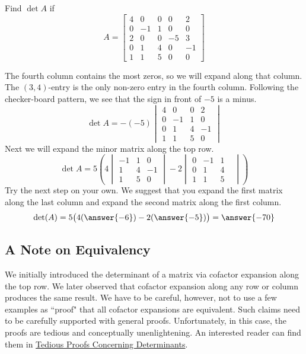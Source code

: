 \documentclass{ximera}
\begin{document}
\begin{example}\label{ex:laplace2}
Find $\det{A}$ if
$$A=\begin{bmatrix}4&0&0&0&2\\0&-1&1&0&0\\2&0&0&-5&3\\0&1&4&0&-1\\1&1&5&0&0\end{bmatrix}$$

\begin{explanation}
The fourth column contains the most zeros, so we will expand along that column.  The  $(3, 4)$-entry is the only non-zero entry in the fourth column.  Following the checker-board pattern, we see that the sign in front of $-5$ is a minus.  
$$\det{A}=-(-5)\begin{vmatrix}4&0&0&2\\0&-1&1&0\\0&1&4&-1\\1&1&5&0\end{vmatrix}
$$
Next we will expand the minor matrix along the top row.
$$\det{A}=5\left(4\begin{vmatrix}-1&1&0\\1&4&-1\\1&5&0\end{vmatrix}-2\begin{vmatrix}0&-1&1\\0&1&4&\\1&1&5\end{vmatrix}\right)$$
Try the next step on your own.  We suggest that you expand the first matrix along the last column and expand the second matrix along the first column.
$$\det(A)=5\big(4(\answer{-6})-2(\answer{-5})\big)=\answer{-70}$$
\end{explanation}
\end{example}

\subsection*{A Note on Equivalency}
We initially introduced the determinant of a matrix via cofactor expansion along the top row.  We later observed that cofactor expansion along any row or column produces the same result.  We have to be careful, however, not to use a few examples as ``proof" that all cofactor expansions are equivalent.  Such claims need to be carefully supported with general proofs.  Unfortunately, in this case, the proofs are tedious and conceptually unenlightening.  An interested reader can find them in \href{https://ximera.osu.edu/oerlinalg/LinearAlgebra/DET-0050/main}{Tedious Proofs Concerning Determinants}.
\end{document}
